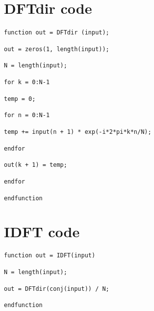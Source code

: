 \documentclass[a4paper, 12pt]{report}
\begin{document}
	\appendix
	\chapter{DFTdir code} %
	\label{sec:dftdir_code}
		\texttt{function out = DFTdir (input);}\par
		\texttt{out = zeros(1, length(input));}\par
		\indent\texttt{N = length(input);}\par
		\texttt{for k = 0:N-1}\par
		\hspace*{2em}\texttt{temp = 0;}\par
		\hspace*{2em}\texttt{for n = 0:N-1}\par
		\hspace*{4em}\texttt{temp += input(n + 1) * exp(-i*2*pi*k*n/N);}\par
		\hspace*{2em}\texttt{endfor}\par
		\hspace*{2em}\texttt{out(k + 1) = temp;}\par
		\texttt{endfor}\par
		\noindent\texttt{endfunction}\par
    \chapter{IDFT code} %
    \label{cha:idft_code}
    	\texttt{function out = IDFT(input)}\par
    	\indent\texttt{N = length(input);}\par
    	\indent\texttt{out = DFTdir(conj(input)) / N;}\par\noindent
    	\texttt{endfunction}
\end{document}
